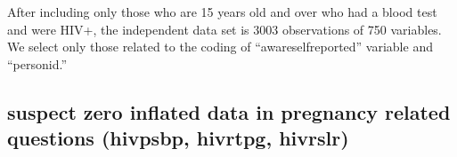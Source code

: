 \documentclass[
]{article}
\newenvironment{Shaded}{\begin{snugshade}}{\end{snugshade}}
\newcommand{\CommentTok}[1]{\textcolor[rgb]{0.56,0.35,0.01}{\textit{#1}}}
\newcommand{\DataTypeTok}[1]{\textcolor[rgb]{0.13,0.29,0.53}{#1}}
\newcommand{\DecValTok}[1]{\textcolor[rgb]{0.00,0.00,0.81}{#1}}
\newcommand{\KeywordTok}[1]{\textcolor[rgb]{0.13,0.29,0.53}{\textbf{#1}}}
\newcommand{\NormalTok}[1]{#1}
\newcommand{\OperatorTok}[1]{\textcolor[rgb]{0.81,0.36,0.00}{\textbf{#1}}}
\newcommand{\StringTok}[1]{\textcolor[rgb]{0.31,0.60,0.02}{#1}}
\begin{document}
After including only those who are 15 years old and over who had a blood
test and were HIV+, the independent data set is 3003 observations of 750
variables. We select only those related to the coding of
``awareselfreported'' variable and ``personid.''

\begin{Shaded}
\end{Shaded}

\hypertarget{suspect-zero-inflated-data-in-pregnancy-related-questions-hivpsbp-hivrtpg-hivrslr}{%
\subsection{suspect zero inflated data in pregnancy related questions
(hivpsbp, hivrtpg,
hivrslr)}\label{suspect-zero-inflated-data-in-pregnancy-related-questions-hivpsbp-hivrtpg-hivrslr}}
\end{document}
